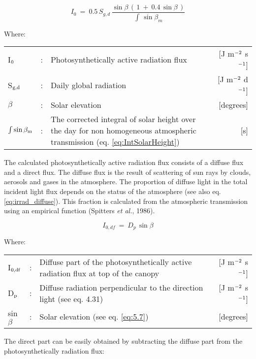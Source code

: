 \begin{equation}
\label{eq:5.8}
I _{0} ~=~ 0.5\, S _{g,d} \,{\frac{\sin \beta \, (\, 1~+~0.4\, \sin \beta \, )}{\int \, \sin \beta _{m} }}
\end{equation}

Where:\\[5pt]
\begin{tabularx}{\textwidth}{llXr}
	I$_{{\rm 0}}$ &:& Photosynthetically active radiation flux    &    
	[J m$^{{\rm -2}}$ s$^{{\rm -1}}$]\\
	S$_{{\rm g,d}}$ &:& Daily global radiation   &     
	[J m$^{{\rm -2}}$ d$^{{\rm -1}}$] \\
	$\beta$ &:& Solar elevation    &    [degrees]\\
	$\int \sin \beta_{{\rm m}}$ &:& The corrected integral of solar height over the day 
	for non homogeneous atmospheric transmission (eq. \ref{eq:IntSolarHeight})   
	&     [s]\\
\end{tabularx}

The calculated photosynthetically active radiation flux consists of a diffuse flux and a
direct flux. The diffuse flux is the result of scattering of sun rays by clouds, aerosols and
gases in the atmosphere. The proportion of diffuse light in the total incident light flux
depends on the status of the atmosphere (see also eq. \ref{eq:irrad_diffuse}). This fraction 
is calculated from the atmospheric transmission using an empirical function (Spitters 
{\it et al.}, 1986).

\begin{equation}
I_{0,df} ~=~ D _{p~} \sin \beta
\end{equation}

Where:\\[5pt]
\begin{tabularx}{\textwidth}{llXr}
	I$_{{\rm 0,df}}$ &:& Diffuse part of the photosynthetically active radiation flux 
	at top of the canopy    &    [J m$^{{\rm -2}}$ s$^{{\rm -1}}$]\\
	D$_{{\rm p}}$ &:& Diffuse radiation perpendicular to the direction 
	light (see eq. 4.31)    &    [J m$^{{\rm -2}}$ s$^{{\rm -1}}$]\\
	sin$\beta$ &:& Solar elevation (see eq. \ref{eq:5.7})    &    [degrees]\\
\end{tabularx}

The direct part can be easily obtained by subtracting the diffuse part from the
photosynthetically radiation flux:

